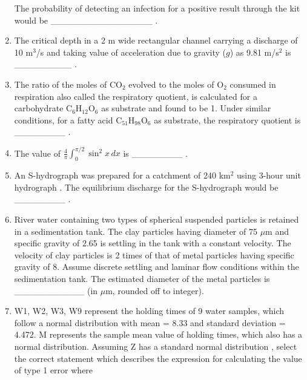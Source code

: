 \documentclass[journal,12pt,onecolumn]{IEEEtran}
\theoremstyle{remark}
\begin{document}
\begin{enumerate}
The probability of detecting an infection for a positive result through the kit would be \_\_\_\_\_\_\_\_\_\_\_\_\_\_\_\_ .
\hfill{}

\item The critical depth in a 2 m wide rectangular channel carrying a discharge of 10 m$^{3}$/s and taking value of acceleration due to gravity ($g$) as 9.81 m/s$^{2}$ is \_\_\_\_\_\_\_\_\_ .
\hfill{}

\item The ratio of the moles of CO$_2$ evolved to the moles of O$_2$ consumed in respiration also called the respiratory quotient, is calculated for a carbohydrate C$_6$H$_{12}$O$_6$ as substrate and found to be 1. Under similar conditions, for a fatty acid C$_{51}$H$_{98}$O$_6$ as substrate, the respiratory quotient is \_\_\_\_\_\_\_\_ .
\hfill{}

\item The value of $\frac{4}{\pi} \int_{0}^{\pi/2} \sin^{2}x \, dx$ is \_\_\_\_\_\_\_\_ .
\hfill{}

\item An S-hydrograph was prepared for a catchment of 240 km$^{2}$ using 3-hour unit hydrograph . The equilibrium discharge for the S-hydrograph would be \_\_\_\_\_\_\_\_ .
\hfill{}

\newpage

\item River water containing two types of spherical suspended particles  is retained in a sedimentation tank. The clay particles having diameter of 75 $\mu$m and specific gravity of 2.65 is settling in the tank with a constant velocity. The velocity of clay particles is 2 times of that of metal particles having specific gravity of 8. Assume discrete settling and laminar flow conditions within the sedimentation tank. The estimated diameter of the metal particles is \_\_\_\_\_\_\_\_\_\_\_ (in $\mu$m, rounded off to integer).
\hfill{}
\item W1, W2, W3, W9 represent the holding times of 9 water samples, which follow a normal distribution with mean = 8.33 and standard deviation = 4.472. M represents the sample mean value of holding times, which also has a normal distribution. Assuming Z has a standard normal distribution , select the correct statement which describes the expression for calculating the value of type 1 error where


\end{enumerate}
\end{document}
